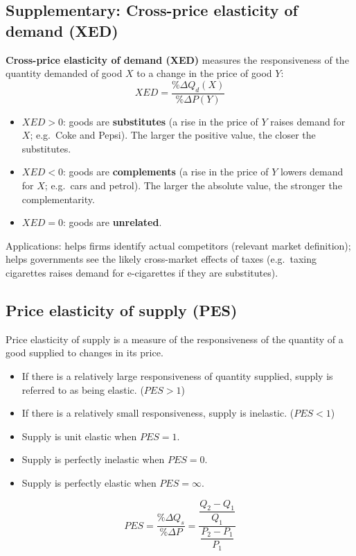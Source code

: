 \documentclass[a4paper,12pt]{article}
\newcommand{\needbold}[1]{\textcolor{red!70!black}{\textbf{#1}}}
\begin{document}
\subsection{Supplementary: Cross-price elasticity of demand (XED)}
\needbold{Cross-price elasticity of demand (XED)} measures the responsiveness of the quantity demanded of good $X$ to a change in the price of good $Y$:
\[XED=\dfrac{\%\Delta Q_d(X)}{\%\Delta P(Y)}\]
\begin{itemize}
  \item $XED>0$: goods are \textbf{substitutes} (a rise in the price of $Y$ raises demand for $X$; e.g.\ Coke and Pepsi). The larger the positive value, the closer the substitutes.
  \item $XED<0$: goods are \textbf{complements} (a rise in the price of $Y$ lowers demand for $X$; e.g.\ cars and petrol). The larger the absolute value, the stronger the complementarity.
  \item $XED=0$: goods are \textbf{unrelated}.
\end{itemize}
Applications: helps firms identify actual competitors (relevant market definition); helps governments see the likely cross-market effects of taxes (e.g.\ taxing cigarettes raises demand for e-cigarettes if they are substitutes).
\subsection{Price elasticity of supply (PES)}
Price elasticity of supply is a measure of the responsiveness of the quantity of a good supplied to changes in its price. 
\begin{itemize}
  \item If there is a relatively large responsiveness of quantity supplied, supply is referred to as being elastic. ($PES>1$)
  \item If there is a relatively small responsiveness, supply is inelastic. ($PES<1$)
  \item Supply is unit elastic when $PES = 1$.
  \item Supply is perfectly inelastic when $PES = 0$.
  \item Supply is perfectly elastic when $PES =\infty$.
\end{itemize}
\[PES=\dfrac{\%\Delta Q_s}{\%\Delta P}=\dfrac{\dfrac{Q_2-Q_1}{Q_1}}{\dfrac{P_2-P_1}{P_1}}\]
\end{document}
